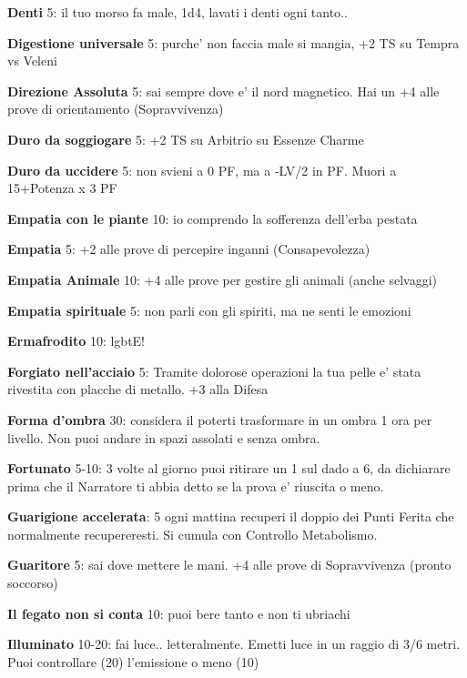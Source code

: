 \documentclass[a4paper,11pt,twoside,openany]{book}
\begin{document}
\textbf{Denti} 5: il tuo morso fa male, 1d4, lavati i denti ogni tanto..

\textbf{Digestione universale} 5: purche' non faccia male si mangia, +2 TS su Tempra vs Veleni

\textbf{Direzione Assoluta} 5: sai sempre dove e' il nord magnetico. Hai un +4 alle prove di orientamento (Sopravvivenza)

\textbf{Duro da soggiogare} 5: +2 TS su Arbitrio su Essenze Charme

\textbf{Duro da uccidere} 5: non svieni a 0 PF, ma a -LV/2 in PF. Muori a 15+Potenza x 3 PF

\textbf{Empatia con le piante} 10: io comprendo la sofferenza dell'erba pestata

\textbf{Empatia} 5: +2 alle prove di percepire inganni (Consapevolezza)

\textbf{Empatia Animale} 10: +4 alle prove per gestire gli animali (anche selvaggi)

\textbf{Empatia spirituale} 5: non parli con gli spiriti, ma ne senti le emozioni

\textbf{Ermafrodito} 10: lgbtE!

\textbf{Forgiato nell'acciaio} 5: Tramite dolorose operazioni la tua pelle e' stata rivestita con placche di metallo. +3 alla Difesa

\textbf{Forma d'ombra} 30: considera il poterti trasformare in un ombra 1 ora per livello. Non puoi andare in spazi assolati e senza ombra.

\textbf{Fortunato} 5-10: 3 volte al giorno puoi ritirare un 1 sul dado a 6, da dichiarare prima che il Narratore ti abbia detto se la prova e' riuscita o meno.

\textbf{Guarigione accelerata}: 5 ogni mattina recuperi il doppio dei Punti Ferita che normalmente recupereresti. Si cumula con Controllo Metabolismo. 

\textbf{Guaritore} 5: sai dove mettere le mani. +4 alle prove di Sopravvivenza (pronto soccorso)

\textbf{Il fegato non si conta} 10: puoi bere tanto e non ti ubriachi

\textbf{Illuminato} 10-20: fai luce.. letteralmente. Emetti luce in un raggio di 3/6 metri. Puoi controllare (20) l'emissione o meno (10)
\end{document}
